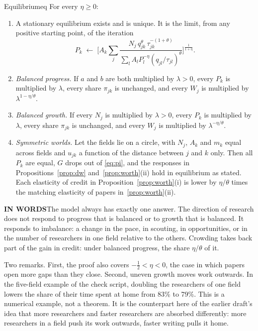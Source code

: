 \documentclass[11pt,letterpaper]{article}
\newcommand{\inwords}{{\sffamily\bfseries\footnotesize\color{hbluedark}IN WORDS}\enspace}
\begin{document}
\begin{prop}{Equilibrium}{eq}
For every $\eta\ge0$:
\begin{enumerate}[label=(\roman*),leftmargin=2em]
\item A stationary equilibrium exists and is unique. It is the limit, from any positive starting point, of the iteration
\begin{equation}\label{eq:map}
P_k\;\longleftarrow\;\bigg[A_k\sum_{j}\frac{N_j\,q_{jk}^{\theta}\,\tau_{jk}^{-(1+\theta)}}{\sum_lA_lP_l^{-\eta}(q_{jl}/\tau_{jl})^{\theta}}\bigg]^{\frac{1}{1+\eta}}.
\end{equation}
\item \emph{Balanced progress.} If $a$ and $b$ are both multiplied by $\lambda>0$, every $P_k$ is multiplied by $\lambda$, every share $\pi_{jk}$ is unchanged, and every $W_j$ is multiplied by $\lambda^{1-\eta/\theta}$.
\item \emph{Balanced growth.} If every $N_j$ is multiplied by $\lambda>0$, every $P_k$ is multiplied by $\lambda$, every share $\pi_{jk}$ is unchanged, and every $W_j$ is multiplied by $\lambda^{-\eta/\theta}$.
\item \emph{Symmetric worlds.} Let the fields lie on a circle, with $N_j$, $A_k$ and $m_k$ equal across fields and $u_{jk}$ a function of the distance between $j$ and $k$ only. Then all $P_k$ are equal, $G$ drops out of \eqref{eq:pi}, and the responses in Propositions~\ref{prop:dw} and~\ref{prop:worth}(ii) hold in equilibrium as stated. Each elasticity of credit in Proposition~\ref{prop:worth}(i) is lower by $\eta/\theta$ times the matching elasticity of papers in~\ref{prop:worth}(ii).
\end{enumerate}
\tcblower
\inwords The model always has exactly one answer. The direction of research does not respond to progress that is balanced or to growth that is balanced. It responds to imbalance: a change in the pace, in scouting, in opportunities, or in the number of researchers in one field relative to the others. Crowding takes back part of the gain in credit: under balanced progress, the share $\eta/\theta$ of it.
\end{prop}

Two remarks. First, the proof also covers $-\tfrac12<\eta<0$, the case in which papers open more gaps than they close. Second, uneven growth moves work outwards. In the five-field example of the check script, doubling the researchers of one field lowers the share of their time spent at home from 83\% to 79\%. This is a numerical example, not a theorem. It is the counterpart here of the earlier draft's idea that more researchers and faster researchers are absorbed differently: more researchers in a field push its work outwards, faster writing pulls it home.
\end{document}
